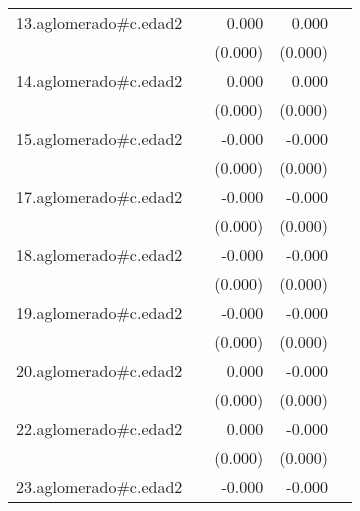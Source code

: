 {\begin{longtable}{l*{4}{D{.}{.}{-1}}}
\addlinespace
13.aglomerado#c.edad2&                     &       0.000\sym{*}  &       0.000         &                     \\
            &                     &     (0.000)         &     (0.000)         &                     \\
\addlinespace
14.aglomerado#c.edad2&                     &       0.000         &       0.000         &                     \\
            &                     &     (0.000)         &     (0.000)         &                     \\
\addlinespace
15.aglomerado#c.edad2&                     &      -0.000\sym{**} &      -0.000         &                     \\
            &                     &     (0.000)         &     (0.000)         &                     \\
\addlinespace
17.aglomerado#c.edad2&                     &      -0.000         &      -0.000         &                     \\
            &                     &     (0.000)         &     (0.000)         &                     \\
\addlinespace
18.aglomerado#c.edad2&                     &      -0.000         &      -0.000\sym{**} &                     \\
            &                     &     (0.000)         &     (0.000)         &                     \\
\addlinespace
19.aglomerado#c.edad2&                     &      -0.000         &      -0.000         &                     \\
            &                     &     (0.000)         &     (0.000)         &                     \\
\addlinespace
20.aglomerado#c.edad2&                     &       0.000         &      -0.000         &                     \\
            &                     &     (0.000)         &     (0.000)         &                     \\
\addlinespace
22.aglomerado#c.edad2&                     &       0.000         &      -0.000         &                     \\
            &                     &     (0.000)         &     (0.000)         &                     \\
\addlinespace
23.aglomerado#c.edad2&                     &      -0.000         &      -0.000         &                     \\

\end{longtable}}
